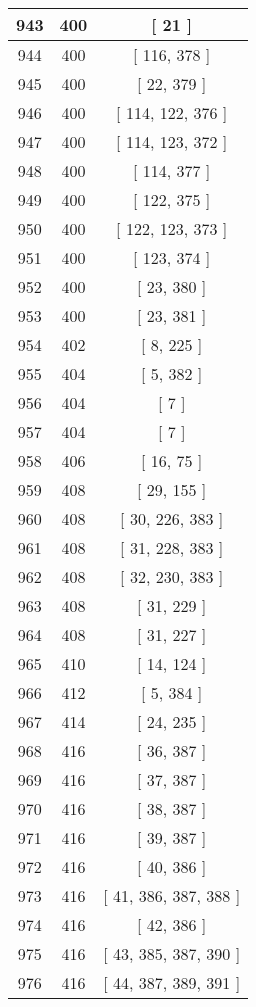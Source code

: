 \begin{center}
\begin{longtable}[H]{|| c c c ||}
\hline
943 & 400 & [ 21 ] \\ 
\hline
944 & 400 & [ 116, 378 ] \\ 
\hline
945 & 400 & [ 22, 379 ] \\ 
\hline
946 & 400 & [ 114, 122, 376 ] \\ 
\hline
947 & 400 & [ 114, 123, 372 ] \\ 
\hline
948 & 400 & [ 114, 377 ] \\ 
\hline
949 & 400 & [ 122, 375 ] \\ 
\hline
950 & 400 & [ 122, 123, 373 ] \\ 
\hline
951 & 400 & [ 123, 374 ] \\ 
\hline
952 & 400 & [ 23, 380 ] \\ 
\hline
953 & 400 & [ 23, 381 ] \\ 
\hline
954 & 402 & [ 8, 225 ] \\ 
\hline
955 & 404 & [ 5, 382 ] \\ 
\hline
956 & 404 & [ 7 ] \\ 
\hline
957 & 404 & [ 7 ] \\ 
\hline
958 & 406 & [ 16, 75 ] \\ 
\hline
959 & 408 & [ 29, 155 ] \\ 
\hline
960 & 408 & [ 30, 226, 383 ] \\ 
\hline
961 & 408 & [ 31, 228, 383 ] \\ 
\hline
962 & 408 & [ 32, 230, 383 ] \\ 
\hline
963 & 408 & [ 31, 229 ] \\ 
\hline
964 & 408 & [ 31, 227 ] \\ 
\hline
965 & 410 & [ 14, 124 ] \\ 
\hline
966 & 412 & [ 5, 384 ] \\ 
\hline
967 & 414 & [ 24, 235 ] \\ 
\hline
968 & 416 & [ 36, 387 ] \\ 
\hline
969 & 416 & [ 37, 387 ] \\ 
\hline
970 & 416 & [ 38, 387 ] \\ 
\hline
971 & 416 & [ 39, 387 ] \\ 
\hline
972 & 416 & [ 40, 386 ] \\ 
\hline
973 & 416 & [ 41, 386, 387, 388 ] \\ 
\hline
974 & 416 & [ 42, 386 ] \\ 
\hline
975 & 416 & [ 43, 385, 387, 390 ] \\ 
\hline
976 & 416 & [ 44, 387, 389, 391 ] \\ 
\hline

\end{longtable}
\end{center}
